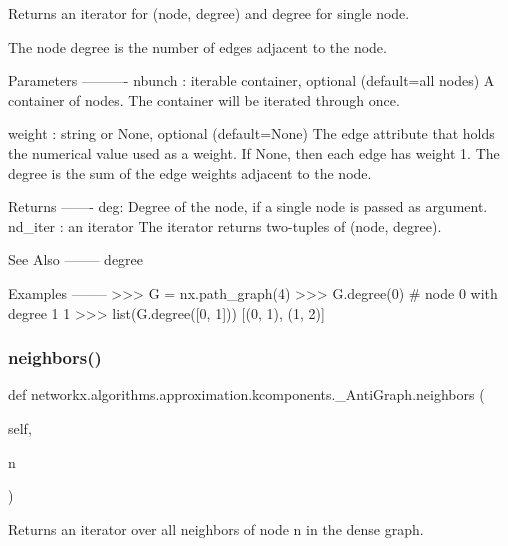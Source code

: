 \begin{DoxyVerb}Returns an iterator for (node, degree) and degree for single node.

The node degree is the number of edges adjacent to the node.

Parameters
----------
nbunch : iterable container, optional (default=all nodes)
    A container of nodes.  The container will be iterated
    through once.

weight : string or None, optional (default=None)
   The edge attribute that holds the numerical value used
   as a weight.  If None, then each edge has weight 1.
   The degree is the sum of the edge weights adjacent to the node.

Returns
-------
deg:
    Degree of the node, if a single node is passed as argument.
nd_iter : an iterator
    The iterator returns two-tuples of (node, degree).

See Also
--------
degree

Examples
--------
>>> G = nx.path_graph(4)
>>> G.degree(0)  # node 0 with degree 1
1
>>> list(G.degree([0, 1]))
[(0, 1), (1, 2)]\end{DoxyVerb}
 \mbox{\label{classnetworkx_1_1algorithms_1_1approximation_1_1kcomponents_1_1__AntiGraph_ade3b9ac1f8c30de5887c6ada772143fd}} 
\subsubsection{\texorpdfstring{neighbors()}{neighbors()}}
{\footnotesize\ttfamily def networkx.\+algorithms.\+approximation.\+kcomponents.\+\_\+\+Anti\+Graph.\+neighbors (\begin{DoxyParamCaption}\item[{}]{self,  }\item[{}]{n }\end{DoxyParamCaption})}

\begin{DoxyVerb}Returns an iterator over all neighbors of node n in the
dense graph.
\end{DoxyVerb}
 \mbox{\label{classnetworkx_1_1algorithms_1_1approximation_1_1kcomponents_1_1__AntiGraph_a3987ff5d9b5e69cf304770ff85a11578}} 
